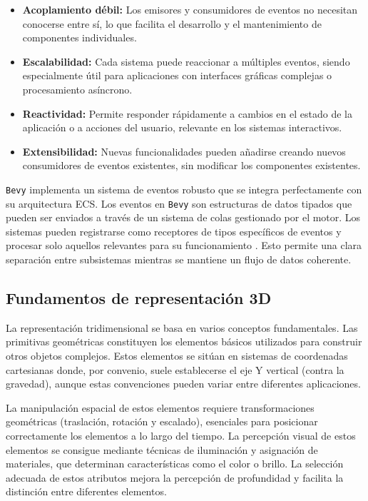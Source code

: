 \begin{itemize}
    \item \textbf{Acoplamiento débil:} Los emisores y consumidores de eventos no necesitan conocerse entre sí, lo que facilita el desarrollo y el mantenimiento de componentes individuales.
    
    \item \textbf{Escalabilidad:} Cada sistema puede reaccionar a múltiples eventos, siendo especialmente útil para aplicaciones con interfaces gráficas complejas o procesamiento asíncrono.
    
    \item \textbf{Reactividad:} Permite responder rápidamente a cambios en el estado de la aplicación o a acciones del usuario, relevante en los sistemas interactivos.
    
    \item \textbf{Extensibilidad:} Nuevas funcionalidades pueden añadirse creando nuevos consumidores de eventos existentes, sin modificar los componentes existentes.
\end{itemize}

\texttt{Bevy} implementa un sistema de eventos robusto que se integra perfectamente con su arquitectura \ac{ECS}. Los eventos en \texttt{Bevy} son estructuras de datos tipados que pueden ser enviados a través de un sistema de colas gestionado por el motor. Los sistemas pueden registrarse como receptores de tipos específicos de eventos y procesar solo aquellos relevantes para su funcionamiento \autocite{EventsBevyPrelude,EventsUnofficialBevy}. Esto permite una clara separación entre subsistemas mientras se mantiene un flujo de datos coherente.

\subsection{Fundamentos de representación 3D}

La representación tridimensional se basa en varios conceptos fundamentales. Las primitivas geométricas constituyen los elementos básicos utilizados para construir otros objetos complejos. Estos elementos se sitúan en sistemas de coordenadas cartesianas donde, por convenio, suele establecerse el eje Y vertical (contra la gravedad), aunque estas convenciones pueden variar entre diferentes aplicaciones.

La manipulación espacial de estos elementos requiere transformaciones geométricas (traslación, rotación y escalado), esenciales para posicionar correctamente los elementos a lo largo del tiempo. La percepción visual de estos elementos se consigue mediante técnicas de iluminación y asignación de materiales, que determinan características como el color o brillo. La selección adecuada de estos atributos mejora la percepción de profundidad y facilita la distinción entre diferentes elementos.

